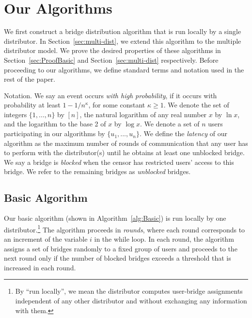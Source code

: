 \documentclass{sig-alternate-05-2015}
\newcommand{\fullpaper}[1]{#1}
\newcommand{\fullpaper}[1]{}
\newcommand{\sfsize}{\fontsize{0.8\baselineskip}{0.68\baselineskip}\selectfont}
\newcommand{\sans}[1]{\textsf{\sfsize \mbox{#1}}}
\newcommand{\para}[1]{\vspace{0.55em} \noindent \sans{{\mbox{#1}}}}
\begin{document}
\section{Our Algorithms} \label{sec:algorithm} 
We first construct a bridge distribution algorithm that is run locally by a single distributor. In Section~\ref{sec:multi-dist}, we extend this algorithm to the multiple distributor model.
We prove the desired properties of these algorithms in Section~\ref{sec:ProofBasic} and Section~\ref{sec:multi-dist} respectively. 
Before proceeding to our algorithms, we define standard terms and notation used in the rest of the paper. 

\para{Notation.} We say an event occurs \emph{with high probability}, if it occurs with probability at least \emph{${1-1/n^\kappa}$}, for some constant ${\kappa \geq 1}$. We denote the set of integers ${\{1,...,n\}}$ by $[n]$, the natural logarithm of any real number $x$ by $\ln{x}$, and the logarithm to the base 2 of $x$ by $\log{x}$. We denote a set of $n$ users participating in our algorithms by ${\{u_1,...,u_n\}}$. We define the \emph{latency} of our algorithm as the maximum number of rounds of communication that any user has to perform with the distributor(s) until he obtains at least one unblocked bridge. \fullpaper{We say a bridge is \emph{blocked} when the censor has restricted users' access to this bridge. We refer to the remaining bridges as \emph{unblocked} bridges.}

\subsection{Basic Algorithm} \label{sec:basic-alg}
Our basic algorithm (shown in Algorithm~\ref{alg:Basic}) is run locally by one distributor.\footnote{By ``run locally'', we mean the distributor computes user-bridge assignments independent of any other distributor and without exchanging any information with them.} 
The algorithm proceeds in \emph{rounds}, where each round corresponds to an increment of the variable $i$ in the while loop.
In each round, the algorithm assigns a set of bridges randomly to a fixed group of users and proceeds to the next round only if the number of blocked bridges exceeds a threshold that is increased in each round. 
\end{document}
